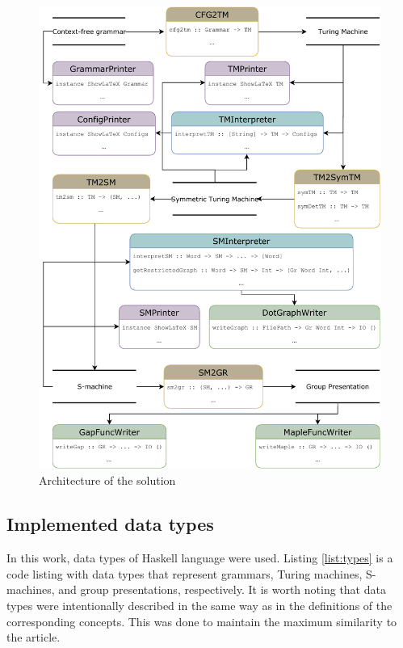\documentclass[conference]{IEEEtran}
\theoremstyle{definition}
\begin{document}
\begin{figure}[bp]
\centerline{\includegraphics[width=\linewidth]{pics/full_arch(9).pdf}}
\caption{Architecture of the solution}
\label{fig:arch}
\end{figure}

\subsection{Implemented data types}

In this work, data types of Haskell language were used. Listing \ref{list:types} is a code listing with data types that represent grammars, Turing machines, S-machines, and group presentations, respectively. It is worth noting that data types were intentionally described in the same way as in the definitions of the corresponding concepts. This was done to maintain the maximum similarity to the article.
\end{document}
